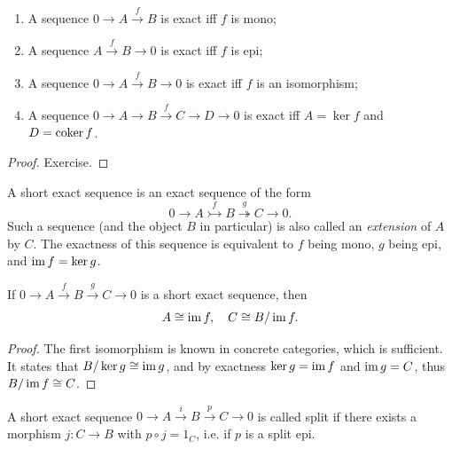 \begin{prop}
    \begin{enumerate}
        \item A sequence $0\to A\overset f\to B$ is exact iff $f$ is mono;
        \item A sequence $A\overset f\to B\to 0$ is exact iff $f$ is epi;
        \item A sequence $0\to A\overset f\to B\to 0$ is exact iff $f$ is an isomorphism;
        \item A sequence $0\to A\to B\overset f\to C\to D\to 0$ is exact iff $A=\ker f$ and $D=\operatorname{coker} f$.
    \end{enumerate}
\end{prop}
\begin{proof}
    Exercise.
\end{proof}

\begin{defn}
 A short exact sequence is an exact sequence of the form
 \[0\to A\overset f\rightarrowtail B\overset g \twoheadrightarrow C\to 0.\]
 Such a sequence (and the object $B$ in particular) is also called an \emph{extension} of $A$ by $C$. The exactness of this sequence is equivalent to $f$ being mono, $g$ being epi, and $\operatorname{im} f=\ker g$.
\end{defn}

\begin{prop}
    If $0\to A\overset f\to B\overset g \to C\to 0$ is a short exact sequence, then 
    \[A\cong \operatorname{im} f,\quad C\cong B/\operatorname{im} f.\]
\end{prop}
\begin{proof}
    The first isomorphism is known in concrete categories, which is sufficient. It states that $B/\ker g\cong \operatorname{im} g$, and by exactness $\ker g=\operatorname{im} f$ and $\operatorname{im} g=C$, thus $B/\operatorname{im} f\cong C$.
\end{proof}

\begin{defn}
 A short exact sequence $0\to A\overset i\to B\overset p \to C\to 0$ is called split if there exists a morphism $j:C\to B$ with $p\circ j=1_C$, i.e. if $p$ is a split epi.
\end{defn}

